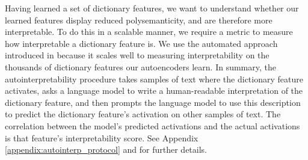 Having learned a set of dictionary features, we want to understand whether our learned features display reduced polysemanticity, and are therefore more interpretable. To do this in a scalable manner, we require a metric to measure how interpretable a dictionary feature is. We use the automated approach introduced in \citet{bills2023language} because it scales well to measuring interpretability on the thousands of dictionary features our autoencoders learn. In summary, the autointerpretability procedure takes samples of text where the dictionary feature activates, asks a language model to write a human-readable interpretation of the dictionary feature, and then prompts the language model to use this description to predict the dictionary feature's activation on other samples of text. The correlation between the model's predicted activations and the actual activations is that feature's interpretability score. See Appendix \ref{appendix:autointerp_protocol} and \citet{bills2023language} for further details.




